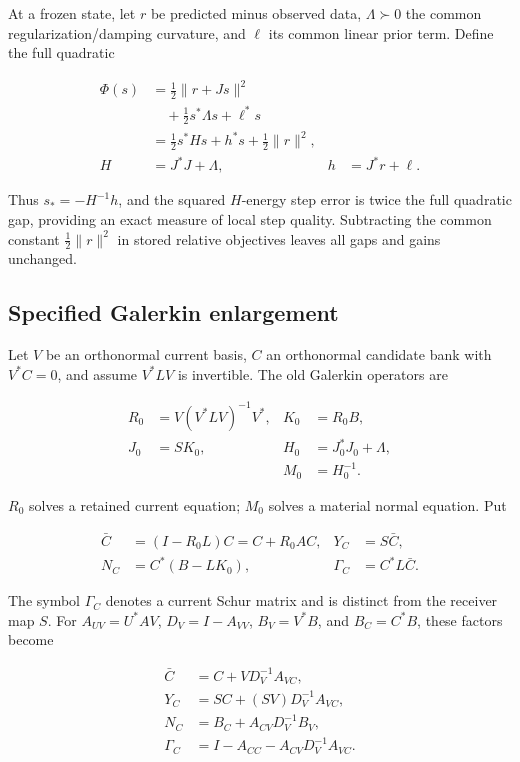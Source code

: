 At a frozen state, let \(r\) be predicted minus observed data, \(\Lambda\succ0\) the common regularization/damping curvature, and \(\ell\) its common linear prior term. Define the full quadratic

\[
\begin{aligned}
\Phi(s)&=\frac12\|r+Js\|^2\\
&\quad+\frac12s^*\Lambda s+\ell^*s\\
&=\frac12s^*Hs+h^*s+\frac12\|r\|^2,\\
H&=J^*J+\Lambda,& h&=J^*r+\ell.
\end{aligned}\tag{3}
\]

Thus \(s_*=-H^{-1}h\), and the squared \(H\)-energy step error is twice the full quadratic gap, providing an exact measure of local step quality. Subtracting the common constant \(\tfrac12\|r\|^2\) in stored relative objectives leaves all gaps and gains unchanged.

\subsection{Specified Galerkin enlargement}

Let \(V\) be an orthonormal current basis, \(C\) an orthonormal candidate bank with \(V^*C=0\), and assume \(V^*LV\) is invertible. The old Galerkin operators are

\[
\begin{aligned}
R_0&=V(V^*LV)^{-1}V^*,& K_0&=R_0B,\\
J_0&=SK_0,& H_0&=J_0^*J_0+\Lambda,\\
&&M_0&=H_0^{-1}.
\end{aligned}\tag{4}
\]

\(R_0\) solves a retained current equation; \(M_0\) solves a material normal equation. Put

\[
\begin{aligned}
\bar C&=(I-R_0L)C=C+R_0AC,& Y_C&=S\bar C,\\
N_C&=C^*(B-LK_0),& \Gamma_C&=C^*L\bar C.
\end{aligned}\tag{5}
\]

The symbol \(\Gamma_C\) denotes a current Schur matrix and is distinct from the receiver map \(S\). For \(A_{UV}=U^*AV\), \(D_V=I-A_{VV}\), \(B_V=V^*B\), and \(B_C=C^*B\), these factors become

\[
\begin{aligned}
\bar C&=C+VD_V^{-1}A_{VC},\\
Y_C&=SC+(SV)D_V^{-1}A_{VC},\\
N_C&=B_C+A_{CV}D_V^{-1}B_V,\\
\Gamma_C&=I-A_{CC}-A_{CV}D_V^{-1}A_{VC}.
\end{aligned} \tag{6}
\]

